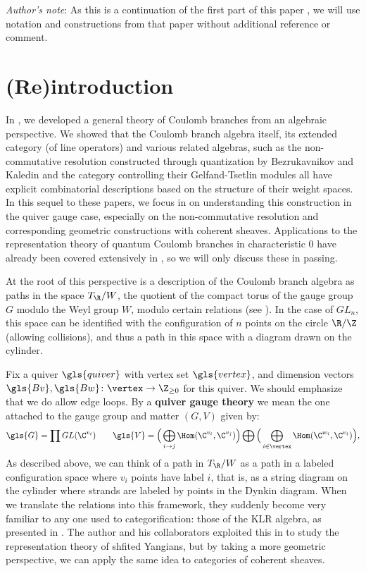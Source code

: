 {\it Author's note}: As this is a continuation of the first part of this paper
\cite{WebcohI}, we will use notation and constructions from that paper
without additional reference or comment. 

\section{(Re)introduction}
\label{sec:reintroduction}

In \cite{WebcohI,WebGT, WebSD}, we developed a general theory of Coulomb
branches from an algebraic perspective.  We showed that the Coulomb
branch algebra itself, its extended category (of line operators) and
various related algebras, such as the non-commutative resolution
constructed through quantization by Bezrukavnikov and Kaledin
\cite{BKpos,KalDEQ, BezNon} and the category controlling their
Gelfand-Tsetlin modules all have explicit combinatorial descriptions
based on the  structure of their weight spaces.  In this sequel to
these papers, we focus in on understanding this construction in the
quiver gauge case, especially on the non-commutative resolution and
corresponding geometric constructions with coherent sheaves.
Applications to the representation theory of quantum Coulomb branches
in characteristic 0 have already been covered extensively in
\cite{KTWWY2, WebGT, Webalt}, so we will only discuss these in
passing.

At the root of this perspective is a description of the Coulomb branch
algebra as paths in the space $T_{\R}/W$, the quotient of the compact
torus of the gauge group $G$ modulo the Weyl group $W$, modulo certain
relations (see \cite[(2.5a--c)]{WebSD}).  In the case
of $GL_n$, this space can be identified with the configuration of $n$
points on the circle $\R/\Z$ (allowing collisions), and thus a path in this space with a
diagram drawn on the cylinder.


Fix a quiver $\gls{quiver}$
with vertex set ${\gls{vertex}}$, and dimension vectors $\gls{Bv},\gls{Bw}\colon {\vertex}\to
\Z_{\geq 0}$ for this quiver.  We should emphasize that we do allow edge loops.   By a {\bf quiver gauge theory} we mean
the one attached to the gauge group and matter $(G,V)$ given by: 
\begin{equation}
\gls{G}=\prod GL(\C^{v_i})\qquad \gls{V}=\Big(\bigoplus_{i\to j}
\Hom(\C^{v_i},\C^{v_j})\Big)\bigoplus \Big(\bigoplus_{i\in {\vertex}}
  \Hom(\C^{w_i},\C^{v_i}) \Big),\label{eq:quiver-gauge2}
\end{equation}
As described above, we can think of a path in $T_{\R}/W$ as a path in
a labeled configuration space where $v_i$ points have label $i$, that
is, as a string diagram on the cylinder where strands are labeled by
points in the Dynkin diagram.  When we translate the relations
\cite[(2.5a--c)]{WebSD} into this framework, they suddenly become very
familiar to any one used to categorification: those of the KLR
algebra, as presented in \cite{KLII}.  The author and his
collaborators exploited this in \cite{KTWWY2} to study the
representation theory of shfited Yangians, but by taking a more
geometric perspective, we can apply the same idea to categories of
coherent sheaves.

